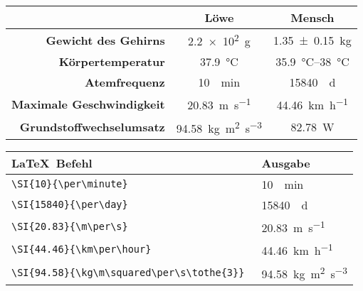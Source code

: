 \begin{frame}[fragile]
	\Losung
	\begin{outputbox}
		\vspace{-0.1cm}
		\begin{center}
			\begin{tabular}{r|cc}
				\hline
				&	\textbf{Löwe}										& \textbf{Mensch} 						\\ \hline
				\textbf{Gewicht des Gehirns}		&	\SI{2.2e2}{\g}										& \SI{1.35 \pm 0.15}{\kg}				\\ 
				\textbf{Körpertemperatur}			&	\SI{37.9}{\degreeCelsius}							& \SIrange{35.9}{38}{\degreeCelsius}	\\
				\textbf{Atemfrequenz}				&	\SI{10}{\per \minute}								& \SI{15840}{\per\day} 					\\
				\textbf{Maximale Geschwindigkeit}	&	\SI{20.83}{\m\per\s}								& \SI{44.46}{\km\per\hour} 				\\ 
				\textbf{Grundstoffwechselumsatz}	&	\SI{94.58}{\kg\meter\squared\per\second\tothe{3}}	&  \SI{82.78}{\watt}\\
				\hline
			\end{tabular}
		\end{center}
		\vspace{-0.1cm}
	\end{outputbox}

				\begin{center}
	\begin{tabular}{ll}
		\toprule
		\LaTeX\ Befehl						&	Ausgabe						\\ \midrule
		\lstinline|\SI{10}{\per\minute} |			&	\SI{10}{\per\minute} 					\\
		\lstinline|\SI{15840}{\per\day} |		&	\SI{15840}{\per\day} 		\\
		\lstinline|\SI{20.83}{\m\per\s} |		&	\SI{20.83}{\m\per\s}			\\
		\lstinline|\SI{44.46}{\km\per\hour} |		&	\SI{44.46}{\km\per\hour}			\\
		\lstinline|\SI{94.58}{\kg\m\squared\per\s\tothe{3}} |		&	\SI{94.58}{\kg\m\squared\per\s\tothe{3}}			\\
		\bottomrule
	\end{tabular}
\end{center}
\end{frame}
